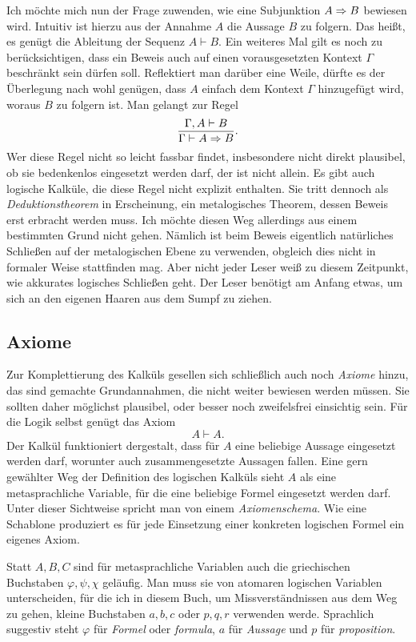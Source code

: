 Ich möchte mich nun der Frage zuwenden, wie eine Subjunktion $A\Rightarrow B$
bewiesen wird. Intuitiv ist hierzu aus der Annahme $A$ die
Aussage $B$ zu folgern. Das heißt, es genügt die Ableitung
der Sequenz $A\vdash B$. Ein weiteres Mal gilt es noch zu
berücksichtigen, dass ein Beweis auch auf einen vorausgesetzten
Kontext $\Gamma$ beschränkt sein dürfen soll. Reflektiert man darüber
eine Weile, dürfte es der Überlegung nach wohl genügen, dass $A$
einfach dem Kontext $\Gamma$ hinzugefügt wird, woraus $B$ zu folgern
ist. Man gelangt zur Regel
\[\dfrac{\Gamma,A\vdash B}{\Gamma\vdash A\Rightarrow B}.\]
Wer diese Regel nicht so leicht fassbar findet, insbesondere nicht
direkt plausibel, ob sie bedenkenlos eingesetzt werden darf, der
ist nicht allein. Es gibt auch logische Kalküle, die diese Regel nicht
explizit enthalten. Sie tritt dennoch als \emph{Deduktionstheorem} in
Erscheinung, ein metalogisches Theorem, dessen Beweis erst erbracht
werden muss. Ich möchte diesen Weg allerdings aus einem bestimmten Grund
nicht gehen. Nämlich ist beim Beweis eigentlich natürliches Schließen
auf der metalogischen Ebene zu verwenden, obgleich dies nicht in formaler
Weise stattfinden mag. Aber nicht jeder Leser weiß zu diesem Zeitpunkt,
wie akkurates logisches Schließen geht. Der Leser benötigt am Anfang
etwas, um sich an den eigenen Haaren aus dem Sumpf zu ziehen.

\subsection{Axiome}

Zur Komplettierung des Kalküls gesellen sich schließlich auch noch
\emph{Axiome} hinzu, das sind gemachte Grundannahmen, die
nicht weiter bewiesen werden müssen. Sie sollten daher möglichst
plausibel, oder besser noch zweifelsfrei einsichtig sein. Für die Logik
selbst genügt das Axiom
\[A\vdash A.\]
Der Kalkül funktioniert dergestalt, dass für $A$ eine beliebige Aussage
eingesetzt werden darf, worunter auch zusammengesetzte Aussagen
fallen. Eine gern gewählter Weg der Definition des logischen
Kalküls sieht $A$ als eine metasprachliche Variable, für die eine
beliebige Formel eingesetzt werden darf. Unter dieser Sichtweise
spricht man von einem \emph{Axiomenschema}. Wie
eine Schablone produziert es für jede Einsetzung einer konkreten
logischen Formel ein eigenes Axiom.

Statt $A,B,C$ sind für metasprachliche Variablen auch
die griechischen Buchstaben $\varphi,\psi,\chi$ geläufig. Man muss sie
von atomaren logischen Variablen unterscheiden, für die ich in diesem
Buch, um Missverständnissen aus dem Weg zu gehen, kleine Buchstaben
$a,b,c$ oder $p,q,r$ verwenden werde. Sprachlich suggestiv steht
$\varphi$ für \emph{Formel} oder \emph{formula}, $a$ für
\emph{Aussage} und $p$ für \emph{proposition}.

